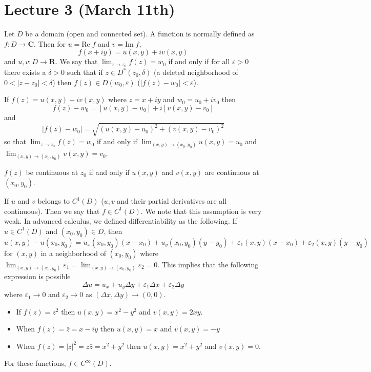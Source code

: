 \section{Lecture 3 (March 11th)}
\begin{defi}
Let $D$ be a domain (open and connected set). A function is normally defined as $f:D\rightarrow {\bm C}$. Then for $u=\mathrm{Re}\;f$ and $v=\mathrm{Im}\;f$, 
\[f(x+iy)=u(x,y)+iv(x,y)\]
and $u,v:D\rightarrow {\bm R}$. We say that $\lim _{z\rightarrow z_0}f(z)=w_{0}$ if and only if for all $\varepsilon >0$ there exists a $\delta >0$ such that if $z\in D^{*}(z_{0},\delta )$ (a deleted neighborhood of $0<|z-z_0|<\delta $) then $f(z)\in D(w_0,\varepsilon )$ ($|f(z)-w_0|<\varepsilon $). 

If $f(z)=u(x,y)+iv(x,y)$ where $z=x+iy$ and $w_0=u_0+iv_0$ then
\[f(z)-w_0=[u(x,y)-u_0]+i[v(x,y)-v_0]\]
and
\[|f(z)-w_0|=\sqrt{(u(x,y)-u_0)^2+(v(x,y)-v_0)^2}\]
so that $\lim _{z\rightarrow z_0}f(z)=w_0$ if and only if $\lim _{(x,y)\rightarrow (x_0,y_0)}u(x,y)=u_0$ and $\lim _{(x,y)\rightarrow (x_0,y_0)}v(x,y)=v_0$. 
\end{defi}
\vspace{2ex}
\begin{thm}
$f(z)$ be continuous at $z_0$ if and only if $u(x,y)$ and $v(x,y)$ are continuous at $(x_0,y_0)$.
\end{thm}
\vspace{2ex}
\begin{defi}
If $u$ and $v$ belongs to $C^{1}(D)$ ($u,v$ and their partial derivatives are all continuous). Then we say that $f\in C^{1}(D)$. We note that this assumption is very weak. In advanced calculus, we defined differentiability as the following. If $u\in C^{1}(D)$ and $(x_0,y_0)\in D$, then 
\[
u(x,y)-u(x_0,y_0)=u_{x}(x_0,y_0)(x-x_0)+u_{y}(x_0,y_0)(y-y_0)+\varepsilon_1(x,y)(x-x_0)+\varepsilon _{2}(x,y)(y-y_0)\] 
for $(x,y)$ in a neighborhood of $(x_0,y_0)$ where $\lim _{(x,y)\rightarrow (x_0,y_0)}\varepsilon_1=\lim _{(x,y)\rightarrow (x_0,y_0)}\varepsilon_2=0$. This implies that the following expression is possible
\[\Delta u=u_{x}+u_{y}\Delta y+\varepsilon _{1}\Delta x+\varepsilon _{2}\Delta y\]
where $\varepsilon_1\rightarrow 0$ and $\varepsilon _{2}\rightarrow 0$ as $(\Delta x,\Delta y)\rightarrow (0,0)$. 
\end{defi}
\vspace{2ex}
\begin{ex}
\begin{itemize}

	\item[] If $f(z)=z^2$ then $u(x,y)=x^2-y^2$ and $v(x,y)=2xy$. 
	\item[] When $f(z)=\bar{z}=x-iy$ then $u(x,y)=x$ and $v(x,y)=-y$ 
	\item[] When $f(z)=|z|^2=z\bar{z}=x^2+y^2$ then $u(x,y)=x^2+y^2$ and $v(x,y)=0$. \end{itemize}
For these functions, $f\in C^{\infty }(D)$.
\end{ex}
